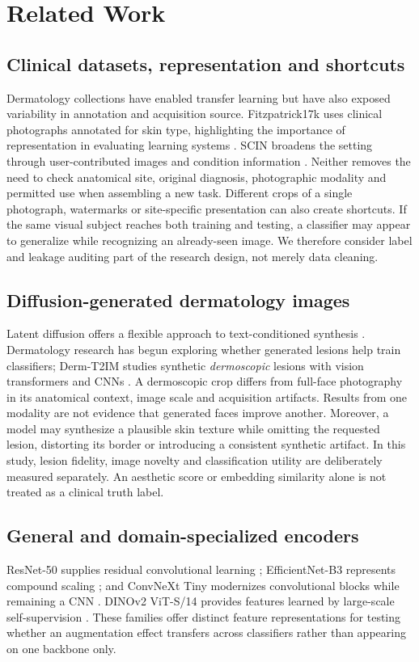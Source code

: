 \section{Related Work}
\subsection{Clinical datasets, representation and shortcuts}
Dermatology collections have enabled transfer learning but have also exposed variability in annotation and acquisition source. Fitzpatrick17k uses clinical photographs annotated for skin type, highlighting the importance of representation in evaluating learning systems \citep{groh2021fitzpatrick}. SCIN broadens the setting through user-contributed images and condition information \citep{ward2024scin,scin_repository}. Neither removes the need to check anatomical site, original diagnosis, photographic modality and permitted use when assembling a new task. Different crops of a single photograph, watermarks or site-specific presentation can also create shortcuts. If the same visual subject reaches both training and testing, a classifier may appear to generalize while recognizing an already-seen image. We therefore consider label and leakage auditing part of the research design, not merely data cleaning.

\subsection{Diffusion-generated dermatology images}
Latent diffusion offers a flexible approach to text-conditioned synthesis \citep{rombach2022latent}. Dermatology research has begun exploring whether generated lesions help train classifiers; Derm-T2IM studies synthetic \emph{dermoscopic} lesions with vision transformers and CNNs \citep{farooq2024dermt2im}. A dermoscopic crop differs from full-face photography in its anatomical context, image scale and acquisition artifacts. Results from one modality are not evidence that generated faces improve another. Moreover, a model may synthesize a plausible skin texture while omitting the requested lesion, distorting its border or introducing a consistent synthetic artifact. In this study, lesion fidelity, image novelty and classification utility are deliberately measured separately. An aesthetic score or embedding similarity alone is not treated as a clinical truth label.

\subsection{General and domain-specialized encoders}
ResNet-50 supplies residual convolutional learning \citep{he2016resnet}; EfficientNet-B3 represents compound scaling \citep{tan2019efficientnet}; and ConvNeXt Tiny modernizes convolutional blocks while remaining a CNN \citep{liu2022convnext}. DINOv2 ViT-S/14 provides features learned by large-scale self-supervision \citep{oquab2024dinov2}. These families offer distinct feature representations for testing whether an augmentation effect transfers across classifiers rather than appearing on one backbone only.

